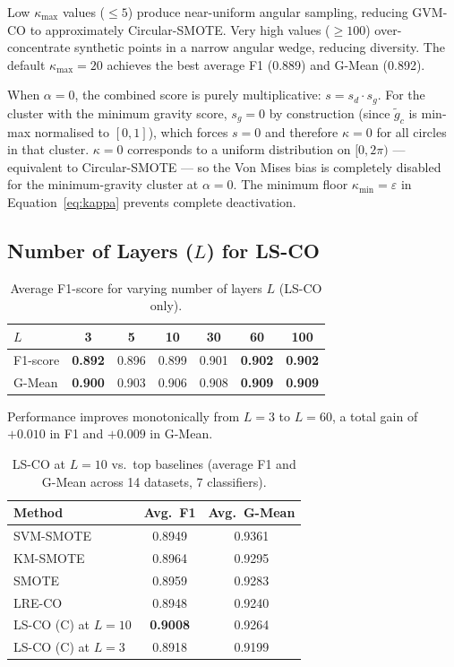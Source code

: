 Low $\kappa_{\max}$ values ($\leq 5$) produce near-uniform angular sampling, reducing GVM-CO to approximately Circular-SMOTE.
Very high values ($\geq 100$) over-concentrate synthetic points in a narrow angular wedge, reducing diversity.
The default $\kappa_{\max} = 20$ achieves the best average F1 (0.889) and G-Mean (0.892).

\begin{remark}[Degenerate Case at $\alpha = 0$]
When $\alpha = 0$, the combined score is purely multiplicative: $s = s_d \cdot s_g$.
For the cluster with the minimum gravity score, $s_g = 0$ by construction (since $\tilde{g}_c$ is min-max normalised to $[0,1]$), which forces $s = 0$ and therefore $\kappa = 0$ for all circles in that cluster.
$\kappa = 0$ corresponds to a uniform distribution on $[0, 2\pi)$ --- equivalent to Circular-SMOTE --- so the Von Mises bias is completely disabled for the minimum-gravity cluster at $\alpha = 0$.
The minimum floor $\kappa_{\min} = \varepsilon$ in Equation~\eqref{eq:kappa} prevents complete deactivation.
\end{remark}

\subsection{Number of Layers ($L$) for LS-CO}

\begin{table}[H]
\centering
\caption{Average F1-score for varying number of layers $L$ (LS-CO only).}
\label{tab:abl:layers}
\begin{tabular}{lcccccc}
\toprule
$L$ & \textbf{3} & 5 & 10 & 30 & 60 & 100 \\
\midrule
F1-score & \textbf{0.892} & 0.896 & 0.899 & 0.901 & \textbf{0.902} & \textbf{0.902} \\
G-Mean   & \textbf{0.900} & 0.903 & 0.906 & 0.908 & \textbf{0.909} & \textbf{0.909} \\
\bottomrule
\end{tabular}
\end{table}

Performance improves monotonically from $L=3$ to $L=60$, a total gain of $+0.010$ in F1 and $+0.009$ in G-Mean.

\begin{table}[H]
\centering
\caption{LS-CO at $L=10$ vs.\ top baselines (average F1 and G-Mean across 14 datasets, 7 classifiers).}
\label{tab:abl:layers_main}
\begin{tabular}{lcc}
\toprule
\textbf{Method} & \textbf{Avg.\ F1} & \textbf{Avg.\ G-Mean} \\
\midrule
SVM-SMOTE          & 0.8949 & 0.9361 \\
KM-SMOTE           & 0.8964 & 0.9295 \\
SMOTE              & 0.8959 & 0.9283 \\
LRE-CO             & 0.8948 & 0.9240 \\
\midrule
LS-CO (C) at $L=10$ & \textbf{0.9008} & 0.9264 \\
LS-CO (C) at $L=3$  & 0.8918 & 0.9199 \\
\bottomrule
\end{tabular}
\end{table}

